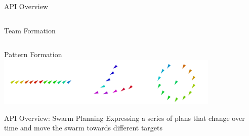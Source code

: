 \documentclass[presentation, 9pt]{beamer}\mode<presentation>{\usetheme{AMSBolognaFC}}
\begin{document}
\begin{frame}{API Overview}
\begin{columns}
\begin{column}{0.3\textwidth}
	\begin{exampleblock}{Team Formation}
	\end{exampleblock}
\end{column}
	
\end{columns}
\begin{exampleblock}{Pattern Formation}
\centering
\includegraphics[width=0.8\textwidth]{img/shapes.png}
\end{exampleblock}
\end{frame}

\begin{frame}{API Overview: Swarm Planning}
	\centering
	Expressing a series of plans that change over time and
	move the swarm towards different targets
\end{frame}
\end{document}
